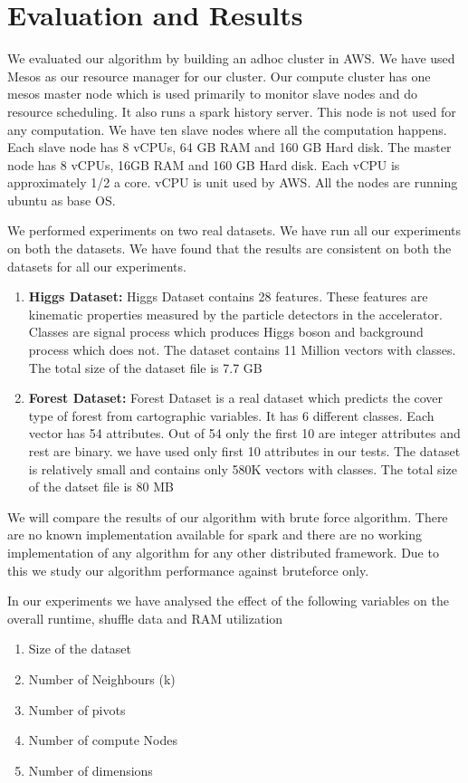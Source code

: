 \chapter{Evaluation and Results} \label{chap:Evaluation and Results}

We evaluated our algorithm by building an adhoc cluster in AWS. We
have used Mesos as our resource manager for our cluster. Our compute
cluster has one mesos master node which is used
primarily to monitor slave nodes and do resource scheduling.
It also runs a spark history server. This node is not used for any computation.
We have ten slave nodes where all the computation happens. Each slave node has
8 vCPUs, 64 GB RAM and 160 GB Hard disk. The master node has 8 vCPUs,
16GB RAM and 160 GB Hard disk. Each vCPU is approximately 1/2 a
core. vCPU is unit used by AWS. All the nodes are running ubuntu as
base OS.

We performed experiments on two real datasets. We have run all our
experiments on both the datasets. We have found that the results are
consistent on both the datasets for all our experiments.

\begin{enumerate}
\item \textbf{Higgs Dataset:}
Higgs Dataset contains 28 features. These features are kinematic
properties measured by the particle detectors in the
accelerator. Classes are signal process which produces Higgs boson and
background process which does not. The dataset contains 11 Million
vectors with classes. The total size of the dataset file is 7.7 GB

\item \textbf{Forest Dataset:}
Forest Dataset is a real dataset which predicts the cover type of
forest from cartographic variables. It has 6 different classes. Each
vector has 54 attributes. Out of 54 only the first 10 are integer
attributes and rest are binary. we have used only first 10 attributes
in our tests. The dataset is relatively small and contains only 580K
vectors with classes. The total size of the datset file is 80 MB
\end{enumerate}

We will compare the results of our algorithm with brute force
algorithm. There are no known implementation available for spark and
there are no working implementation of any algorithm for any other
distributed framework. Due to this we study our algorithm performance
against bruteforce only.

\begin{minipage}{\linewidth}
In our experiments we have analysed the effect of the following variables on the
overall runtime, shuffle data and RAM utilization
\begin{enumerate}
\item Size of the dataset
\item Number of Neighbours (k)
\item Number of pivots
\item Number of compute Nodes
\item Number of dimensions
\end{enumerate}
\end{minipage}

